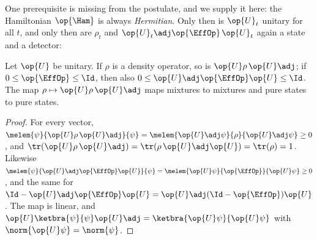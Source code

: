 One prerequisite is missing from the postulate, and we supply it here: the Hamiltonian $\op{\Ham}$
is always \emph{Hermitian}. Only then is $\op{U}_t$ unitary for all $t$, and only
then are $\rho_t$ and $\op{U}_t\adj\op{\EffOp}\,\op{U}_t$ again a state and a detector:

\begin{proposition}\label{c04.prop.dynamik}
  Let $\op{U}$ be unitary. If $\rho$ is a density operator, so is $\op{U}\rho\,\op{U}\adj$; if
  $0 \leq \op{\EffOp} \leq \Id$, then also $0 \leq \op{U}\adj\op{\EffOp}\op{U} \leq \Id$. The map
  $\rho \mapsto \op{U}\rho\,\op{U}\adj$ maps mixtures to mixtures and pure states to pure states.
\end{proposition}
\begin{proof}
  For every vector,
  $\melem{\psi}{\op{U}\rho\,\op{U}\adj}{\psi} = \melem{\op{U}\adj\psi}{\rho}{\op{U}\adj\psi} \geq 0$,
  and $\tr(\op{U}\rho\,\op{U}\adj) = \tr(\rho\,\op{U}\adj\op{U}) = \tr(\rho) = 1$. Likewise
  $\melem{\psi}{\op{U}\adj\op{\EffOp}\op{U}}{\psi} = \melem{\op{U}\psi}{\op{\EffOp}}{\op{U}\psi} \geq 0$,
  and the same for $\Id - \op{U}\adj\op{\EffOp}\op{U} = \op{U}\adj(\Id - \op{\EffOp})\op{U}$. The
  map is linear, and $\op{U}\ketbra{\psi}{\psi}\op{U}\adj = \ketbra{\op{U}\psi}{\op{U}\psi}$
  with $\norm{\op{U}\psi} = \norm{\psi}$.
\end{proof}

